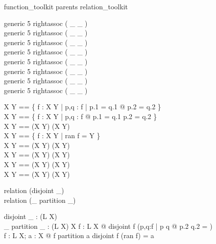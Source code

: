 \zsection function\_toolkit parents relation\_toolkit\\

\begin{zed}
  generic 5 rightassoc ( \_ \pfun  \_ )\\
  generic 5 rightassoc ( \_ \pinj  \_ )\\
  generic 5 rightassoc ( \_ \inj  \_ )\\
  generic 5 rightassoc ( \_ \psurj  \_ )\\
  generic 5 rightassoc ( \_ \surj  \_ )\\
  generic 5 rightassoc ( \_ \bij  \_ )\\
  generic 5 rightassoc ( \_ \ffun  \_ )\\
  generic 5 rightassoc ( \_ \finj  \_ )
\end{zed}

\begin{zed}
  X \pfun Y == \{ f : X \rel Y | \forall p,q : f | p.1 = q.1 @ p.2 = q.2 \}\\
  X \pinj Y == \{ f : X \rel Y | \forall p,q : f @ p.1 = q.1 \iff p.2 = q.2 \}\\ 
  X \inj Y == (X \pinj Y) \cap (X \fun Y)\\
  X \psurj Y == \{ f : X \pfun Y | ran f = Y \}\\
  X \surj Y == (X \psurj Y) \cap (X \fun Y)\\
  X \bij Y == (X \surj Y) \cap (X \inj Y)\\
  X \ffun Y == (X \pfun Y) \cap \finset (X \cross Y)\\
  X \finj Y == (X \ffun Y) \cap (X \pinj Y)
\end{zed}

\begin{zed}
  relation (disjoint \_)\\
  relation (\_ partition \_)
\end{zed}

\begin{gendef}[L,X]
  disjoint \_ : \power (L \rel \power X)\\
  \_ partition \_ : (L \rel \power X) \rel \power X
\where
  \forall f : L \rel \power X @ disjoint f \iff 
      (\forall p,q:f | p \neq q @ p.2 \cap q.2 = \emptyset)\\
  \forall f : L \rel \power X; a : \power X @
      f partition a \iff disjoint f \land \bigcap (ran f) = a
\end{gendef}
